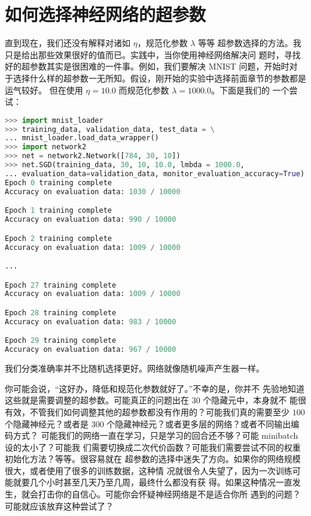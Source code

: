 \section{如何选择神经网络的超参数}
\label{sec:how_to_choose_a_neural_network's_hyper-parameters}

直到现在，我们还没有解释对诸如\learningrate{} $\eta$，规范化参数 $\lambda$ 等等
超参数选择的方法。我只是给出那些效果很好的值而已。实践中，当你使用神经网络解决问
题时，寻找好的超参数其实是很困难的一件事。例如，我们要解决 MNIST 问题，开始时对
于选择什么样的超参数一无所知。假设，刚开始的实验中选择前面章节的参数都是运气较好。
但在使用\learningrate{} $\eta=10.0$ 而规范化参数 $\lambda=1000.0$。下面是我们的
一个尝试：

\begin{lstlisting}[language=Python]
>>> import mnist_loader
>>> training_data, validation_data, test_data = \
... mnist_loader.load_data_wrapper()
>>> import network2
>>> net = network2.Network([784, 30, 10])
>>> net.SGD(training_data, 30, 10, 10.0, lmbda = 1000.0,
... evaluation_data=validation_data, monitor_evaluation_accuracy=True)
Epoch 0 training complete
Accuracy on evaluation data: 1030 / 10000

Epoch 1 training complete
Accuracy on evaluation data: 990 / 10000

Epoch 2 training complete
Accuracy on evaluation data: 1009 / 10000

...

Epoch 27 training complete
Accuracy on evaluation data: 1009 / 10000

Epoch 28 training complete
Accuracy on evaluation data: 983 / 10000

Epoch 29 training complete
Accuracy on evaluation data: 967 / 10000
\end{lstlisting}

我们分类准确率并不比随机选择更好。网络就像随机噪声产生器一样。

你可能会说，“这好办，降低\learningrate{}和规范化参数就好了。”不幸的是，你并不
先验地知道这些就是需要调整的超参数。可能真正的问题出在 $30$ 个隐藏元中，本身就不
能很有效，不管我们如何调整其他的超参数都没有作用的？可能我们真的需要至少 $100$
个隐藏神经元？或者是 $300$ 个隐藏神经元？或者更多层的网络？或者不同输出编码方式？
可能我们的网络一直在学习，只是学习的回合还不够？可能 minibatch 设的太小了？可能我
们需要切换成二次代价函数？可能我们需要尝试不同的权重初始化方法？等等。很容易就在
超参数的选择中迷失了方向。如果你的网络规模很大，或者使用了很多的训练数据，这种情
况就很令人失望了，因为一次训练可能就要几个小时甚至几天乃至几周，最终什么都没有获
得。如果这种情况一直发生，就会打击你的自信心。可能你会怀疑神经网络是不是适合你所
遇到的问题？可能就应该放弃这种尝试了？

